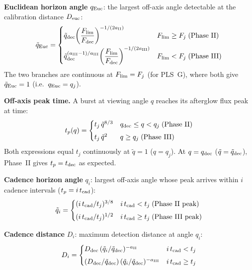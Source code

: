 \documentclass[11pt,a4paper]{article}
\begin{document}
\noindent\textbf{Euclidean horizon angle} $q_{\rm Euc}$: the largest off-axis angle detectable at the calibration distance $D_{\rm euc}$:
\begin{equation}
\tilde{q}_{\rm Euc} = \begin{cases}
\tilde{q}_{\rm dec}\!\left(\dfrac{F_{\rm lim}}{F_{\rm dec}}\right)^{-1/(2a_{\rm II})} & F_{\rm lim}\ge F_j\;\text{(Phase II)}\\[8pt]
\tilde{q}_{\rm dec}^{(a_{\rm III}-1)/a_{\rm III}}\!\left(\dfrac{F_{\rm lim}}{F_{\rm dec}}\right)^{-1/(2a_{\rm III})} & F_{\rm lim}<F_j\;\text{(Phase III)}
\end{cases}
\end{equation}
The two branches are continuous at $F_{\rm lim}=F_j$ (for PLS~G), where both give $\tilde{q}_{\rm Euc}=1$ (i.e.\ $q_{\rm Euc}=q_j$).

\noindent\textbf{Off-axis peak time.}
A burst at viewing angle $q$ reaches its afterglow flux peak at time:
\begin{equation}
t_p(q) = \begin{cases}
t_j\,\tilde{q}^{8/3} & q_{\rm dec}\le q<q_j\;\text{(Phase II)} \\[4pt]
t_j\,\tilde{q}^{2}   & q\ge q_j\;\text{(Phase III)}
\end{cases}
\end{equation}
Both expressions equal $t_j$ continuously at $\tilde{q}=1$ ($q=q_j$). At $q=q_{\rm dec}$ ($\tilde{q}=\tilde{q}_{\rm dec}$), Phase~II gives $t_p=t_{\rm dec}$ as expected.

\noindent\textbf{Cadence horizon angle} $q_i$: largest off-axis angle whose peak arrives within $i$ cadence intervals ($t_p=i\,t_{\rm cad}$):
\begin{equation}
\tilde{q}_i = \begin{cases}
(i\,t_{\rm cad}/t_j)^{3/8} & i\,t_{\rm cad}<t_j\;\text{(Phase II peak)}\\[4pt]
(i\,t_{\rm cad}/t_j)^{1/2} & i\,t_{\rm cad}\ge t_j\;\text{(Phase III peak)}
\end{cases}
\end{equation}

\noindent\textbf{Cadence distance} $D_i$: maximum detection distance at angle $q_i$:
\begin{equation}
D_i = \begin{cases}
D_{\rm dec}\,(\tilde{q}_i/\tilde{q}_{\rm dec})^{-a_{\rm II}} & i\,t_{\rm cad}<t_j\\[4pt]
(D_{\rm dec}/\tilde{q}_{\rm dec})\,(\tilde{q}_i/\tilde{q}_{\rm dec})^{-a_{\rm III}} & i\,t_{\rm cad}\ge t_j
\end{cases}
\end{equation}
\end{document}
